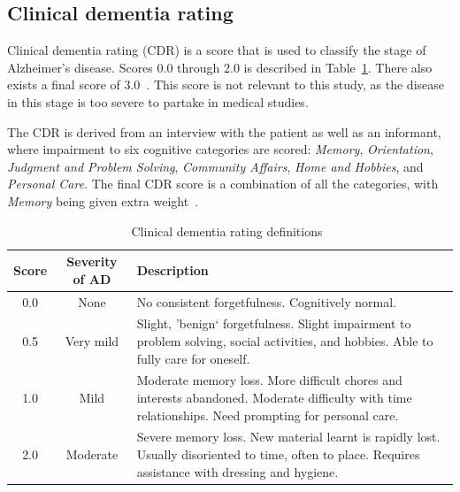 \documentclass{kththesis}
\renewcommand{\arraystretch}{1.2}
\begin{document}
\subsection{Clinical dementia rating}
Clinical dementia rating (CDR) is a score that is used to classify the stage of Alzheimer’s disease. Scores 0.0 through 2.0 is described in Table~\ref{tab:cdr_definition}. There also exists a final score of 3.0~\cite{cdr}. This score is not relevant to this study, as the disease in this stage is too severe to partake in medical studies.

The CDR is derived from an interview with the patient as well as an informant, where impairment to six cognitive categories are scored: \textit{Memory}, \textit{Orientation}, \textit{Judgment and Problem Solving}, \textit{Community Affairs}, \textit{Home and Hobbies}, and \textit{Personal Care}. The final CDR score is a combination of all the categories, with \textit{Memory} being given extra weight~\cite{cdr}.

\begin{table}[h]
  \renewcommand{\arraystretch}{1.2}
  \begin{center}
    \caption{Clinical dementia rating definitions~\cite{cdr}}
    \label{tab:cdr_definition}
    \begin{tabularx}{\textwidth}{c|cX}
      \textbf{Score} & \textbf{Severity of AD} & \textbf{Description} \\
      \toprule
      0.0 & None & No consistent forgetfulness. Cognitively normal. \\
      0.5 & Very mild & Slight, 'benign` forgetfulness. Slight impairment to problem solving, social activities, and hobbies. Able to fully care for oneself. \\
      1.0 & Mild & Moderate memory loss. More difficult chores and interests abandoned. Moderate difficulty with time relationships. Need prompting for personal care. \\
      2.0 & Moderate & Severe memory loss. New material learnt is rapidly lost. Usually disoriented to time, often to place. Requires assistance with dressing and hygiene. \\
    \end{tabularx}
  \end{center}
\end{table}
\end{document}
